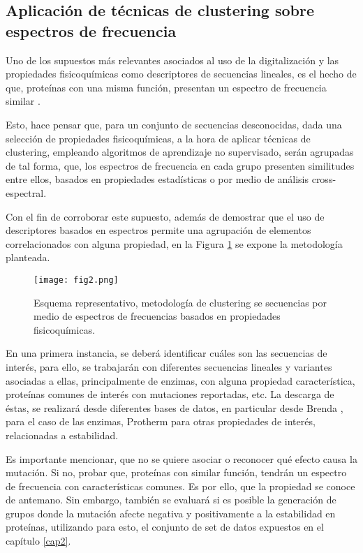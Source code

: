 \subsection{Aplicación de técnicas de clustering sobre espectros de frecuencia}

Uno de los supuestos más relevantes asociados al uso de la digitalización y las propiedades fisicoquímicas como descriptores de secuencias lineales, es el hecho de que, proteínas con una misma función, presentan un espectro de frecuencia similar \cite{veljkovic1985possible}. 

Esto, hace pensar que, para un conjunto de secuencias desconocidas, dada una selección de propiedades fisicoquímicas, a la hora de aplicar técnicas de clustering, empleando algoritmos de aprendizaje no supervisado, serán agrupadas de tal forma, que, los espectros de frecuencia en cada grupo presenten similitudes entre ellos, basados en propiedades estadísticas o por medio de análisis cross-espectral.
 
Con el fin de corroborar este supuesto, además de demostrar que el uso de descriptores basados en espectros permite una agrupación de elementos correlacionados con alguna propiedad, en la Figura \ref{cap3:fig2} se expone la metodología planteada.

\begin{figure}[!h]
	
	\centering
	\texttt{[image: fig2.png]}
	\caption{Esquema representativo, metodología de clustering se secuencias por medio de espectros de frecuencias basados en propiedades fisicoquímicas.}
	\label{cap3:fig2}
\end{figure}

En una primera instancia, se deberá identificar cuáles son las secuencias de interés, para ello, se trabajarán con diferentes secuencias lineales y variantes asociadas a ellas, principalmente de enzimas, con alguna propiedad característica, proteínas comunes de interés con mutaciones reportadas, etc. La descarga de éstas, se realizará desde diferentes bases de datos, en particular desde Brenda \cite{schomburg2004brenda}, para el caso de las enzimas, Protherm \cite{bava2004protherm} para otras propiedades de interés, relacionadas a estabilidad. 

Es importante mencionar, que no se quiere asociar o reconocer qué efecto causa la mutación. Si no, probar que, proteínas con similar función, tendrán un espectro de frecuencia con características comunes. Es por ello, que la propiedad se conoce de antemano. Sin embargo, también se evaluará si es posible la generación de grupos donde la mutación afecte negativa y positivamente a la estabilidad en proteínas, utilizando para esto, el conjunto de set de datos expuestos en el capítulo \ref{cap2}.

